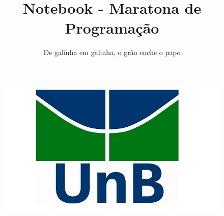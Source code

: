 \documentclass{article}
\title{Notebook - Maratona de Programação}
\author{De galinha em galinha, o grão enche o papo}
\date{}
\begin{document}
\begin{figure}[t]
\includegraphics[scale=0.4]{unb.jpg}
\centering
\end{figure}
\maketitle
\end{document}
